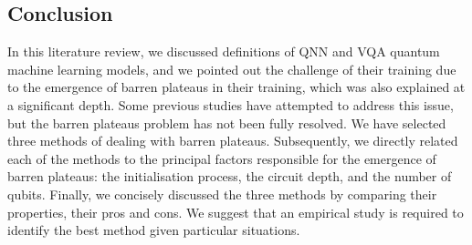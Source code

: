 \subsection{Conclusion}
In this literature review, we discussed definitions of QNN and VQA quantum machine learning models, and we pointed out the challenge of their training due to the emergence of barren plateaus in their training, which was also explained at a significant depth.
Some previous studies have attempted to address this issue, but the barren plateaus problem has not been fully resolved.
We have selected three methods of dealing with barren plateaus.
Subsequently, we directly related each of the methods to the principal factors responsible for the emergence of barren plateaus: the initialisation process, the circuit depth, and the number of qubits.
Finally, we concisely discussed the three methods by comparing their properties, their pros and cons.
We suggest that an empirical study is required to identify the best method given particular situations.